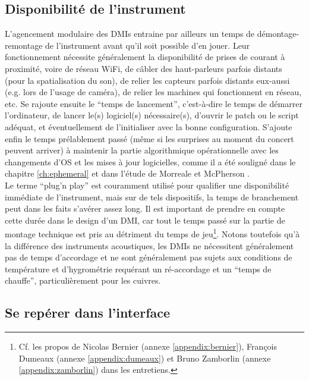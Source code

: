 \subsection{Disponibilité de l'instrument}

\noindent L'agencement modulaire des \glspl{DMI} entraine par ailleurs un temps de démontage-remontage de l'instrument avant qu'il soit possible d'en jouer. Leur fonctionnement nécessite généralement la disponibilité de prises de courant à proximité, voire de réseau WiFi, de câbler des haut-parleurs parfois distants (pour la spatialisation du son), de relier les capteurs parfois distants eux-aussi (e.g. lors de l'usage de caméra), de relier les machines qui fonctionnent en réseau, etc. Se rajoute ensuite le ``temps de lancement'', c'est-à-dire le temps de démarrer l'ordinateur, de lancer le(s) logiciel(s) nécessaire(s), d'ouvrir le patch ou le script adéquat, et éventuellement de l'initialiser avec la bonne configuration. S'ajoute enfin le temps prélablement passé (même si les surprises au moment du concert peuvent arriver) à maintenir la partie algorithmique opérationnelle avec les changements d'\gls{OS} et les mises à jour logicielles, comme il a été souligné dans le chapitre \ref{ch:ephemeral} et dans l'étude de Morreale et McPherson \cite{morreale_design_2017}.\\
\indent Le terme ``plug'n play'' est couramment utilisé pour qualifier une disponibilité immédiate de l'instrument, mais sur de tels dispositifs, la temps de branchement peut dans les faits s'avérer assez long. Il est important de prendre en compte cette durée dans le design d'un \gls{DMI}, car tout le temps passé sur la partie de montage technique est pris au détriment du temps de jeu\footnote{Cf. les propos de Nicolas Bernier (annexe \ref{appendix:bernier}), François Dumeaux (annexe \ref{appendix:dumeaux}) et Bruno Zamborlin (annexe \ref{appendix:zamborlin}) dans les entretiens.}. Notons toutefois qu'à la différence des instruments acoustiques, les \glspl{DMI} ne nécessitent généralement pas de temps d'accordage et ne sont généralement pas sujets aux conditions de température et d'hygrométrie requérant un ré-accordage et un ``temps de chauffe'', particulièrement pour les cuivres.


\subsection{Se repérer dans l'interface}

